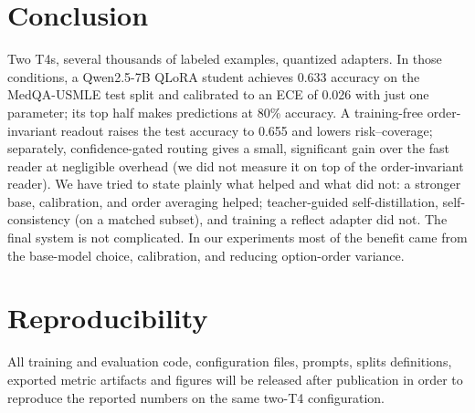 \documentclass[conference]{IEEEtran}
\begin{document}
\section{Conclusion}
Two T4s, several thousands of labeled examples, quantized adapters. In those conditions, a Qwen2.5-7B QLoRA student achieves 0.633 accuracy on the MedQA-USMLE test split and calibrated to an ECE of 0.026 with just one parameter; its top half makes predictions at 80\% accuracy. A training-free order-invariant readout raises the test accuracy to 0.655 and lowers risk--coverage; separately, confidence-gated routing gives a small, significant gain over the fast reader at negligible overhead (we did not measure it on top of the order-invariant reader). We have tried to state plainly what helped and what did not: a stronger base, calibration, and order averaging helped; teacher-guided self-distillation, self-consistency (on a matched subset), and training a reflect adapter did not. The final system is not complicated. In our experiments most of the benefit came from the base-model choice, calibration, and reducing option-order variance.

\section*{Reproducibility}
All training and evaluation code, configuration files, prompts, splits definitions, exported metric artifacts and figures will be released after publication in order to reproduce the reported numbers on the same two-T4 configuration.
\end{document}
